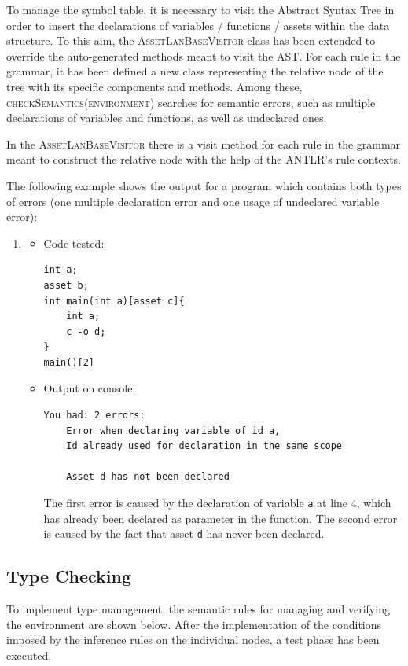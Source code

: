 \documentclass[11pt]{article} %
\begin{document}
\medskip

To manage the symbol table, it is necessary to visit the Abstract Syntax Tree in order to insert the declarations of variables / functions / assets within the data structure. To this aim, the \textsc{AssetLanBaseVisitor} class has been extended to override the auto-generated methods meant to visit the AST. For each rule in the grammar, it has been defined a new class representing the relative node of the tree with its specific components and methods. Among these, \textsc{checkSemantics(environment)} searches for semantic errors, such as multiple declarations of variables and functions, as well as undeclared ones.

\medskip

In the \textsc{AssetLanBaseVisitor} there is a visit method for each rule in the grammar meant to construct the relative node with the help of the ANTLR's rule contexts. 

\medskip

The following example shows the output for a program which contains both types of errors (one multiple declaration error and one usage of undeclared variable error):

\begin{enumerate}
\item
	\begin{itemize}
		\item Code tested: \begin{lstlisting}
int a;
asset b;
int main(int a)[asset c]{
    int a;
    c -o d;
}
main()[2]
		\end{lstlisting}
		\item Output on console: \begin{lstlisting}
You had: 2 errors:
	Error when declaring variable of id a,
	Id already used for declaration in the same scope
	
	Asset d has not been declared
		\end{lstlisting}
		
	The first error is caused by the declaration of variable \verb|a| at line 4, which has already been declared as parameter in the function.
	The second error is caused by the fact that asset \verb|d| has never been declared.
	\end{itemize}
\end{enumerate}

\subsection{Type Checking}
To implement type management, the semantic rules for managing and verifying the environment are shown below. After the implementation of the conditions imposed by the inference rules on the individual nodes, a test phase has been executed.
\end{document}
